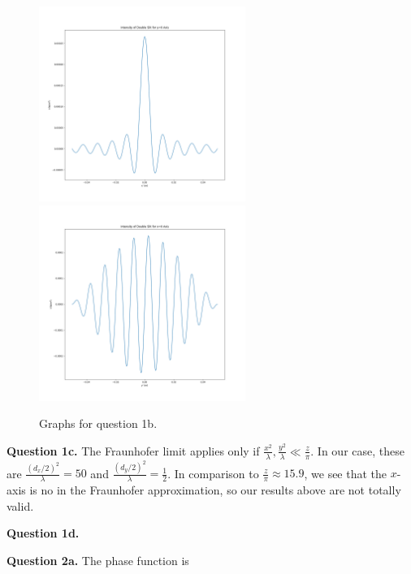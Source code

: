 \documentclass[letterpaper, reqno,11pt]{article}
\begin{document}
\begin{figure}[htpb]
    \centering
    \includegraphics[width=0.6\textwidth]{q1x}
    \includegraphics[width=0.6\textwidth]{q1y}
    \caption{Graphs for question 1b.}
    \label{fig:q1b}
\end{figure}

{\medskip\noindent\bf Question 1c.} The Fraunhofer limit applies only if $\frac{x^2}{\lambda}, \frac{y^2}{\lambda} \ll \frac{z}{\pi}$. In our case, these are $\frac{(d_x/2)^2}{\lambda}=50$ and $\frac{(d_y /2)^2}{\lambda}=\frac{1}{2}$. In comparison to $\frac{z}{\pi}\approx 15.9$, we see that the $x$-axis is no in the Fraunhofer approximation, so our results above are not totally valid.

{\medskip\noindent\bf Question 1d.} 



{\medskip\noindent\bf Question 2a.} The phase function is 
\end{document}
